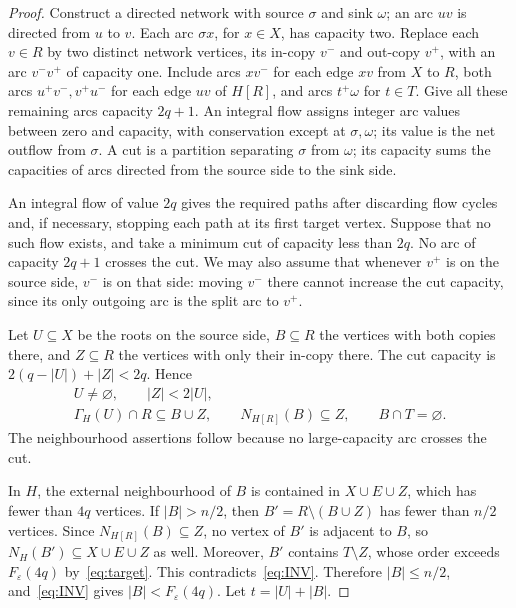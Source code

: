 \documentclass[10pt,letterpaper]{article}
\theoremstyle{definition}
\theoremstyle{remark}
\newcommand{\eps}{\varepsilon}
\begin{document}
\begin{proof}
Construct a directed network with source $\sigma$ and sink $\omega$; an arc $uv$ is directed from $u$ to $v$. Each arc $\sigma x$, for $x\in X$, has capacity two. Replace each $v\in R$ by two distinct network vertices, its in-copy $v^-$ and out-copy $v^+$, with an arc $v^-v^+$ of capacity one. Include arcs $xv^-$ for each edge $xv$ from $X$ to $R$, both arcs $u^+v^-,v^+u^-$ for each edge $uv$ of $H[R]$, and arcs $t^+\omega$ for $t\in T$. Give all these remaining arcs capacity $2q+1$. An integral flow assigns integer arc values between zero and capacity, with conservation except at $\sigma,\omega$; its value is the net outflow from $\sigma$. A cut is a partition separating $\sigma$ from $\omega$; its capacity sums the capacities of arcs directed from the source side to the sink side.

An integral flow of value $2q$ gives the required paths after discarding flow cycles and, if necessary, stopping each path at its first target vertex. Suppose that no such flow exists, and take a minimum cut of capacity less than $2q$. No arc of capacity $2q+1$ crosses the cut. We may also assume that whenever $v^+$ is on the source side, $v^-$ is on that side: moving $v^-$ there cannot increase the cut capacity, since its only outgoing arc is the split arc to $v^+$.

Let $U\subseteq X$ be the roots on the source side, $B\subseteq R$ the vertices with both copies there, and $Z\subseteq R$ the vertices with only their in-copy there. The cut capacity is $2(q-|U|)+|Z|<2q$. Hence
\begin{equation}\label{eq:cut}
\begin{gathered}
U\ne\varnothing,\qquad |Z|<2|U|,\\
\Gamma_H(U)\cap R\subseteq B\cup Z,\qquad
N_{H[R]}(B)\subseteq Z,\qquad B\cap T=\varnothing.
\end{gathered}
\end{equation}
The neighbourhood assertions follow because no large-capacity arc crosses the cut.

In $H$, the external neighbourhood of $B$ is contained in $X\cup E\cup Z$, which has fewer than $4q$ vertices. If $|B|>n/2$, then $B'=R\setminus(B\cup Z)$ has fewer than $n/2$ vertices. Since $N_{H[R]}(B)\subseteq Z$, no vertex of $B'$ is adjacent to $B$, so $N_H(B')\subseteq X\cup E\cup Z$ as well. Moreover, $B'$ contains $T\setminus Z$, whose order exceeds $F_\eps(4q)$ by~\eqref{eq:target}. This contradicts~\eqref{eq:INV}. Therefore $|B|\le n/2$, and~\eqref{eq:INV} gives $|B|<F_\eps(4q)$. Let $t=|U|+|B|$.


\end{proof}
\end{document}
